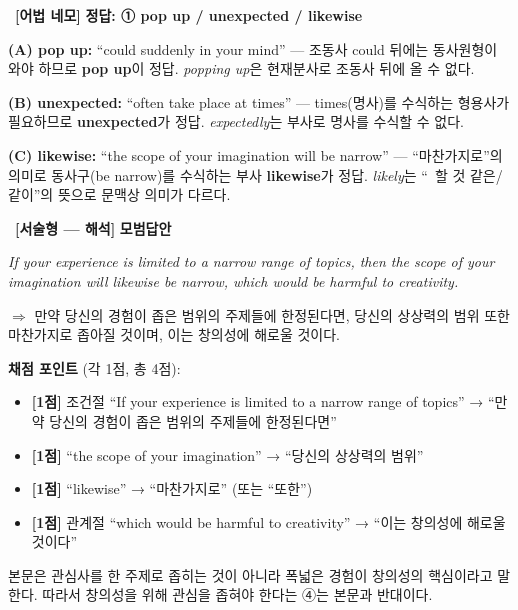 \documentclass[11pt,a4paper]{article}
\newcommand{\qno}[1]{\par\vspace{10pt}\noindent{\sffamily\bfseries #1.}\ }
\begin{document}
\qno{2}\textbf{[어법 네모]} \textbf{정답: ① pop up / unexpected / likewise}

\par\vspace{4pt}
\textbf{(A) pop up:} ``could suddenly \underline{\hspace{1.5cm}} in your mind'' — 조동사 could 뒤에는 동사원형이 와야 하므로 \textbf{pop up}이 정답. \textit{popping up}은 현재분사로 조동사 뒤에 올 수 없다.

\par\vspace{4pt}
\textbf{(B) unexpected:} ``often take place at \underline{\hspace{1.5cm}} times'' — times(명사)를 수식하는 형용사가 필요하므로 \textbf{unexpected}가 정답. \textit{expectedly}는 부사로 명사를 수식할 수 없다.

\par\vspace{4pt}
\textbf{(C) likewise:} ``the scope of your imagination will \underline{\hspace{1.5cm}} be narrow'' — ``마찬가지로''의 의미로 동사구(be narrow)를 수식하는 부사 \textbf{likewise}가 정답. \textit{likely}는 ``~할 것 같은/같이''의 뜻으로 문맥상 의미가 다르다.

\qno{3}\textbf{[서술형 — 해석]} \textbf{모범답안}

\par\vspace{6pt}
\begin{pbox}
\textit{If your experience is limited to a narrow range of topics, then the scope of your imagination will likewise be narrow, which would be harmful to creativity.}

\vspace{6pt}
$\Rightarrow$ 만약 당신의 경험이 좁은 범위의 주제들에 한정된다면, 당신의 상상력의 범위 또한 마찬가지로 좁아질 것이며, 이는 창의성에 해로울 것이다.
\end{pbox}

\par\vspace{6pt}
\textbf{채점 포인트} (각 1점, 총 4점):
\begin{itemize}[leftmargin=2em,itemsep=2pt]
  \item \textbf{[1점]} 조건절 ``If your experience is limited to a narrow range of topics'' → ``만약 당신의 경험이 좁은 범위의 주제들에 한정된다면''
  \item \textbf{[1점]} ``the scope of your imagination'' → ``당신의 상상력의 범위''
  \item \textbf{[1점]} ``likewise'' → ``마찬가지로'' (또는 ``또한'')
  \item \textbf{[1점]} 관계절 ``which would be harmful to creativity'' → ``이는 창의성에 해로울 것이다''
\end{itemize}

\vspace{8pt}
\par 본문은 관심사를 한 주제로 좁히는 것이 아니라 폭넓은 경험이 창의성의 핵심이라고 말한다. 따라서 창의성을 위해 관심을 좁혀야 한다는 ④는 본문과 반대이다.
\end{document}
